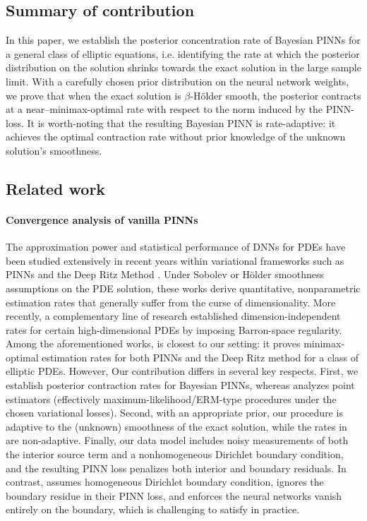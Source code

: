 \documentclass{article}
\theoremstyle{plain}
\theoremstyle{definition}
\theoremstyle{remark}
\begin{document}
\subsection{Summary of contribution} In this paper, we establish the posterior concentration rate of Bayesian PINNs for a general class of elliptic equations, i.e. identifying the rate at which the posterior distribution on the solution shrinks
towards the exact solution in the large sample limit. With a carefully chosen prior distribution on the neural network weights, we prove that when the exact solution is $\beta$-H\"older smooth, the posterior contracts at a near–minimax-optimal rate with respect to the norm induced by the PINN-loss. It is worth-noting that the resulting Bayesian PINN is rate-adaptive: it achieves the optimal contraction rate without prior knowledge of the unknown solution’s smoothness. 

\subsection{Related work}

\paragraph{Convergence analysis of vanilla PINNs}  The approximation power and statistical performance of DNNs for PDEs have been studied extensively in recent years within variational frameworks such as PINNs \cite{mishra2023estimates,de2022error,shin2023error,lu2021machine}  and the Deep Ritz Method \cite{e2018,jiao2024error}. Under Sobolev or H\"older smoothness assumptions on the PDE solution, these works derive quantitative, nonparametric estimation rates that generally suffer from the curse of dimensionality. More recently, a complementary line of research \cite{chen2021representation,chen2023regularity,weinan2022some,lu2022priori,lu2021priori} established dimension-independent rates for certain high-dimensional PDEs by imposing Barron-space regularity.  Among the aforementioned works, \cite{lu2021machine} is closest to our setting: it proves minimax-optimal estimation rates for both PINNs and the Deep Ritz method for a class of elliptic PDEs. However, Our contribution differs in several key respects. First, we establish posterior contraction rates for Bayesian PINNs, whereas \cite{lu2021machine} analyzes point estimators (effectively maximum-likelihood/ERM-type procedures under the chosen variational losses). Second, with an appropriate prior, our procedure is adaptive to the (unknown) smoothness of the exact solution, while the rates in \cite{lu2021machine} are non-adaptive.  Finally, our data model includes noisy measurements of both the interior source term and a nonhomogeneous Dirichlet boundary condition, and the resulting PINN loss penalizes both interior and boundary residuals. In contrast,  \cite{lu2021machine} assumes homogeneous Dirichlet boundary condition, ignores the boundary residue in their PINN loss, and enforces the neural networks vanish entirely on the boundary, which is challenging to satisfy in practice.  
\end{document}
